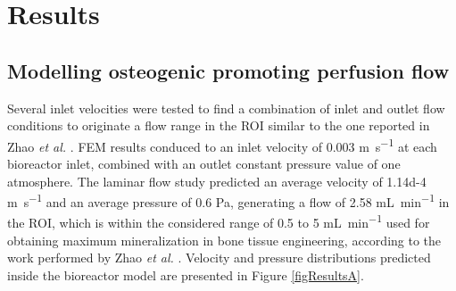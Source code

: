 \section{Results}


\subsection{Modelling osteogenic promoting perfusion flow}

Several inlet velocities were tested to find a combination of inlet and outlet flow conditions to originate a flow range in the \ac{ROI} similar to the one reported in Zhao \textit{et al.} \cite{Zhao2018-ci}. \ac{FEM} results conduced to an inlet velocity of 0.003 \si{\meter\per\second} at each bioreactor inlet, combined with an outlet constant pressure value of one atmosphere. The laminar flow study predicted an average velocity of \num{1.14d-4} \si{\meter\per\second} and an average pressure of 0.6 \si{\pascal}, generating a flow of 2.58 \si{\milli\liter\per\minute} in the \ac{ROI}, which is within the considered range of 0.5 to 5 \si{\milli\liter\per\minute} used for obtaining maximum mineralization in bone tissue engineering, according to the work performed by Zhao \textit{et al.} \cite{Zhao2018-ci}. Velocity and pressure distributions predicted inside the bioreactor model are presented in Figure \ref{figResultsA}.

